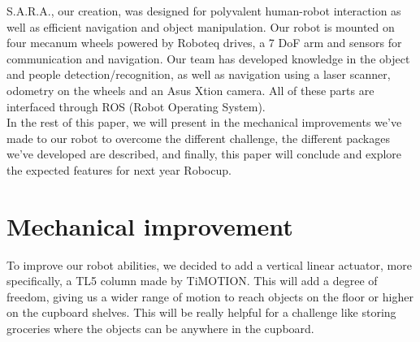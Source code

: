 \documentclass[runningheads,a4paper]{llncs}
\begin{document}
S.A.R.A., our creation, was designed for polyvalent human-robot interaction as well as efficient navigation and object manipulation. Our robot is mounted on four mecanum wheels powered by Roboteq drives, a 7 DoF arm and sensors for communication and navigation. Our team has developed knowledge in the object and people detection/recognition, as well as navigation using a laser scanner, odometry on the wheels and an Asus Xtion camera. All of these parts are interfaced through ROS (Robot Operating System). \\

In the rest of this paper, we will present in the mechanical improvements we've made to our robot to overcome the different challenge, the different packages we've developed are described, and finally, this paper will conclude and explore the expected features for next year Robocup.


\section{Mechanical improvement}

\tab To improve our robot abilities, we decided to add a vertical linear actuator, more specifically, a TL5 column made by TiMOTION. This will add a degree of freedom, giving us a wider range of motion to reach objects on the floor or higher on the cupboard shelves. This will be really helpful for a challenge like storing groceries where the objects can be anywhere in the cupboard. \\
\end{document}
